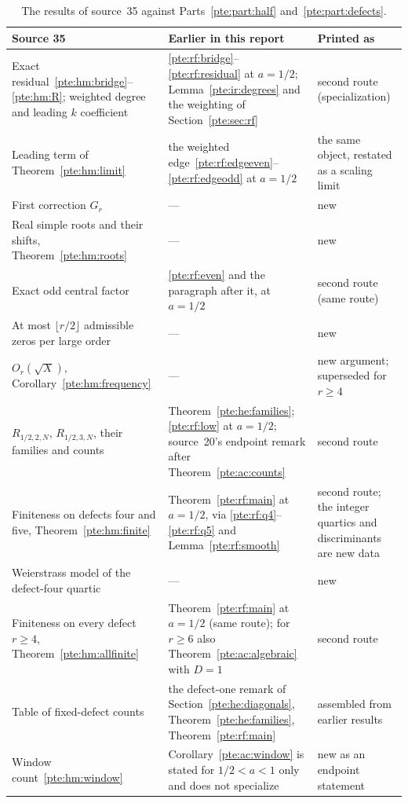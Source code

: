 \documentclass[11pt,a4paper]{article}
\numberwithin{equation}{section}
\theoremstyle{definition}
\theoremstyle{plain}
\begin{document}
\begin{table}[ht]
\centering\small
\caption{The results of source~35 against Parts~\ref{pte:part:half} and~\ref{pte:part:defects}.}\label{pte:tab:hmroutes}
\begin{tabular}{@{}>{\raggedright\arraybackslash}p{}>{\raggedright\arraybackslash}p{}>{\raggedright\arraybackslash}p{}@{}}
\toprule
Source 35 & Earlier in this report & Printed as\\
\midrule
Exact residual~\eqref{pte:hm:bridge}--\eqref{pte:hm:R}; weighted degree and leading $k$ coefficient & \eqref{pte:rf:bridge}--\eqref{pte:rf:residual} at $a=1/2$; Lemma~\ref{pte:ir:degrees} and the weighting of Section~\ref{pte:sec:rf} & second route (specialization)\\
Leading term of Theorem~\ref{pte:hm:limit} & the weighted edge~\eqref{pte:rf:edgeeven}--\eqref{pte:rf:edgeodd} at $a=1/2$ & the same object, restated as a scaling limit\\
First correction $G_r$ & --- & new\\
Real simple roots and their shifts, Theorem~\ref{pte:hm:roots} & --- & new\\
Exact odd central factor & \eqref{pte:rf:even} and the paragraph after it, at $a=1/2$ & second route (same route)\\
At most $\lfloor r/2\rfloor$ admissible zeros per large order & --- & new\\
$O_r(\sqrt X)$, Corollary~\ref{pte:hm:frequency} & --- & new argument; superseded for $r\ge4$\\
$R_{1/2,2,N}$, $R_{1/2,3,N}$, their families and counts & Theorem~\ref{pte:he:families}; \eqref{pte:rf:low} at $a=1/2$; source~20's endpoint remark after Theorem~\ref{pte:ac:counts} & second route\\
Finiteness on defects four and five, Theorem~\ref{pte:hm:finite} & Theorem~\ref{pte:rf:main} at $a=1/2$, via \eqref{pte:rf:q4}--\eqref{pte:rf:q5} and Lemma~\ref{pte:rf:smooth} & second route; the integer quartics and discriminants are new data\\
Weierstrass model of the defect-four quartic & --- & new\\
Finiteness on every defect $r\ge4$, Theorem~\ref{pte:hm:allfinite} & Theorem~\ref{pte:rf:main} at $a=1/2$ (same route); for $r\ge6$ also Theorem~\ref{pte:ac:algebraic} with $D=1$ & second route\\
Table of fixed-defect counts & the defect-one remark of Section~\ref{pte:he:diagonals}, Theorem~\ref{pte:he:families}, Theorem~\ref{pte:rf:main} & assembled from earlier results\\
Window count~\eqref{pte:hm:window} & Corollary~\ref{pte:ac:window} is stated for $1/2<a<1$ only and does not specialize & new as an endpoint statement\\
\bottomrule
\end{tabular}
\end{table}
\end{document}
